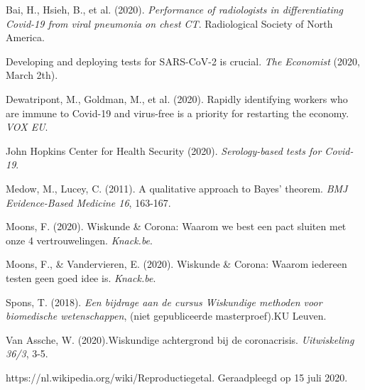\begin{bronnen}
\item Bai, H., Hsieh, B., et al. (2020). \textit{Performance of radiologists in differentiating Covid-19 from viral pneumonia on chest CT}. Radiological Society of North America.
\item Developing and deploying tests for SARS-CoV-2 is crucial. \emph{The Economist} (2020, March 2th).
\item Dewatripont, M., Goldman, M., et al. (2020). Rapidly identifying workers who are immune to Covid-19 and virus-free is a priority for restarting the economy. \emph{VOX EU}.
\item John Hopkins Center for Health Security (2020). \textit{Serology-based tests for Covid-19}.
\item Medow, M., Lucey, C. (2011). A qualitative approach to Bayes' theorem. \emph{BMJ Evidence-Based Medicine 16}, 163-167.
\item Moons, F. (2020). Wiskunde \& Corona: Waarom we best een pact sluiten met onze 4 vertrouwelingen. \emph{Knack.be}.
\item Moons, F., \& Vandervieren, E. (2020). Wiskunde \& Corona: Waarom iedereen testen geen goed idee is. \emph{Knack.be}.
\item Spons, T. (2018). \emph{Een bijdrage aan de cursus Wiskundige methoden voor biomedische wetenschappen}, (niet gepubliceerde masterproef).KU Leuven. \item Van Assche, W. (2020).Wiskundige achtergrond bij de coronacrisis. \emph{Uitwiskeling 36/3}, 3-5.
\item https://nl.wikipedia.org/wiki/Reproductiegetal. Geraadpleegd op 15 juli 2020.
\end{bronnen}

